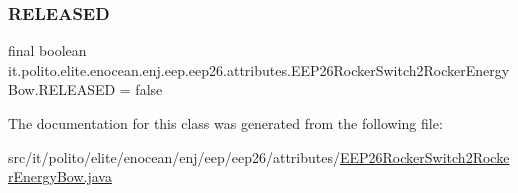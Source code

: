 \subsubsection{\texorpdfstring{R\+E\+L\+E\+A\+S\+ED}{RELEASED}}
{\footnotesize\ttfamily final boolean it.\+polito.\+elite.\+enocean.\+enj.\+eep.\+eep26.\+attributes.\+E\+E\+P26\+Rocker\+Switch2\+Rocker\+Energy\+Bow.\+R\+E\+L\+E\+A\+S\+ED = false\hspace{0.3cm}{\ttfamily [static]}}



The documentation for this class was generated from the following file\+:\begin{DoxyCompactItemize}
\item 
src/it/polito/elite/enocean/enj/eep/eep26/attributes/\hyperlink{_e_e_p26_rocker_switch2_rocker_energy_bow_8java}{E\+E\+P26\+Rocker\+Switch2\+Rocker\+Energy\+Bow.\+java}\end{DoxyCompactItemize}
